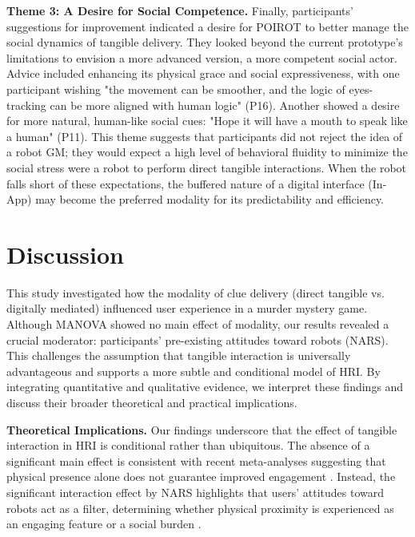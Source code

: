 \documentclass[sigconf,screen]{acmart-tagged}
\begin{document}
\noindent \textbf{Theme 3: A Desire for Social Competence.}
Finally, participants' suggestions for improvement indicated a desire for POIROT to better manage the social dynamics of tangible delivery. They looked beyond the current prototype's limitations to envision a more advanced version, a more competent social actor. Advice included enhancing its physical grace and social expressiveness, with one participant wishing "the movement can be smoother, and the logic of eyes-tracking can be more aligned with human logic" (P16). Another showed a desire for more natural, human-like social cues: "Hope it will have a mouth to speak like a human" (P11). This theme suggests that participants did not reject the idea of a robot GM; they would expect a high level of behavioral fluidity to minimize the social stress were a robot to perform direct tangible interactions. When the robot falls short of these expectations, the buffered nature of a digital interface (In-App) may become the preferred modality for its predictability and efficiency.

\vspace{-12pt}
\section{Discussion}
This study investigated how the modality of clue delivery (direct tangible vs. digitally mediated) influenced user experience in a murder mystery game. Although MANOVA showed no main effect of modality, our results revealed a crucial moderator: participants' pre-existing attitudes toward robots (NARS). This challenges the assumption that tangible interaction is universally advantageous and supports a more subtle and conditional model of HRI. By integrating quantitative and qualitative evidence, we interpret these findings and discuss their broader theoretical and practical implications.

\noindent \textbf{Theoretical Implications.}
Our findings underscore that the effect of tangible interaction in HRI is conditional rather than ubiquitous. The absence of a significant main effect is consistent with recent meta-analyses suggesting that physical presence alone does not guarantee improved engagement \cite{esterwood2025virtually, schulz2025investigating, correia2020dark}. Instead, the significant interaction effect by NARS highlights that users' attitudes toward robots act as a filter, determining whether physical proximity is experienced as an engaging feature or a social burden \cite{kabacinska2025influence, naneva2020systematic, hancock2011meta}.
\end{document}
